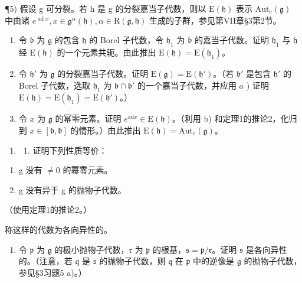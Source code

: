 ¶5) 假设 g 可分裂。若 h 是 g 的分裂嘉当子代数，则以 \(\mathrm{E}(\mathfrak{h})\) 表示 \(\mathrm{Aut}_{e}(\mathfrak{g})\) 中由诸 \(e^{\operatorname{ad} x}, x \in \mathfrak{g}^{\alpha}(\mathfrak{h}), \alpha \in \mathrm{R}(\mathfrak{g}, \mathfrak{h})\) 生成的子群，参见第VII章§3第2节。

\begin{enumerate}
\def\labelenumi{\alph{enumi})}
\item
  令 \(\mathfrak{b}\) 为 \(\mathfrak{g}\) 的包含 \(\mathfrak{h}\) 的 Borel 子代数，令 \(\mathfrak{h}_1\) 为 \(\mathfrak{b}\) 的嘉当子代数。证明 \(\mathfrak{h}_1\) 与 \(\mathfrak{h}\) 经 \(\mathrm{E}(\mathfrak{h})\) 的一个元素共轭。由此推出 \(\mathrm{E}(\mathfrak{h}) = \mathrm{E}(\mathfrak{h}_1)\)。
\item
  令 \(\mathfrak{h}'\) 为 \(\mathfrak{g}\) 的分裂嘉当子代数。证明 \(\mathrm{E}(\mathfrak{g}) = \mathrm{E}(\mathfrak{h}')\)。（若 \(\mathfrak{b}'\) 是包含 \(\mathfrak{h}'\) 的 Borel 子代数，选取 \(\mathfrak{h}_1\) 为 \(\mathfrak{b} \cap \mathfrak{b}'\) 的一个嘉当子代数，并应用 \(a\) ) 证明 \(\mathrm{E}(\mathfrak{h}) = \mathrm{E}(\mathfrak{h}_1) = \mathrm{E}(\mathfrak{h}')\)。）
\item
  令 \(x\) 为 \(\mathfrak{g}\) 的幂零元素。证明 \(e^{\mathrm{ad}x} \in \mathrm{E}(\mathfrak{h})\)。（利用 b) 和定理1的推论2，化归到 \(x \in [\mathfrak{b}, \mathfrak{b}]\) 的情形。）由此推出 \(\mathrm{E}(\mathfrak{h}) = \mathrm{Aut}_e(\mathfrak{g})\)。
\end{enumerate}

\begin{enumerate}
\def\labelenumi{\arabic{enumi})}
\setcounter{enumi}{5}
\tightlist
\item
  \begin{enumerate}
  \def\labelenumii{\alph{enumii})}
  \tightlist
  \item
    证明下列性质等价：
  \end{enumerate}
\end{enumerate}

\begin{enumerate}
\def\labelenumi{(\roman{enumi})}
\item
  g 没有 \(\neq 0\) 的幂零元素。
\item
  g 没有异于 g 的抛物子代数。
\end{enumerate}

（使用定理1的推论2。）

称这样的代数为各向异性的。

\begin{enumerate}
\def\labelenumi{\alph{enumi})}
\setcounter{enumi}{1}
\tightlist
\item
  令 \(\mathfrak{p}\) 为 \(\mathfrak{g}\) 的极小抛物子代数，\(\mathfrak{r}\) 为 \(\mathfrak{p}\) 的根基，\(\mathfrak{s} = \mathfrak{p} / \mathfrak{r}\)。证明 \(\mathfrak{s}\) 是各向异性的。（注意，若 \(\mathfrak{q}\) 是 \(\mathfrak{s}\) 的抛物子代数，则 \(\mathfrak{q}\) 在 \(\mathfrak{p}\) 中的逆像是 \(\mathfrak{g}\) 的抛物子代数，参见§3习题5 a)。）
\end{enumerate}

